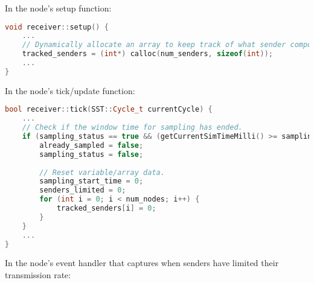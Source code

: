 \documentclass{article}
\begin{document}
\noindent In the node's setup function:
\begin{lstlisting}[language=C++, commentstyle=\fontfamily{fve}\selectfont\color{black}]
void receiver::setup() {
	...
	// Dynamically allocate an array to keep track of what sender components have limited transmission rates during a window of time.
	tracked_senders = (int*) calloc(num_senders, sizeof(int));
	...
}
\end{lstlisting}

\noindent In the node's tick/update function:

\begin{lstlisting}[language=C++, commentstyle=\fontfamily{fve}\selectfont\color{black}]
bool receiver::tick(SST::Cycle_t currentCycle) {
	...
	// Check if the window time for sampling has ended.
	if (sampling_status == true && (getCurrentSimTimeMilli() >= sampling_start_time + window_size)) {
		already_sampled = false;
		sampling_status = false;
		
		// Reset variable/array data. 
		sampling_start_time = 0;
		senders_limited = 0;
		for (int i = 0; i < num_nodes; i++) {
			tracked_senders[i] = 0;
		}
	}
	...
}
\end{lstlisting}
					
\noindent In the node's event handler that captures when senders have limited their transmission rate:
\end{document}
